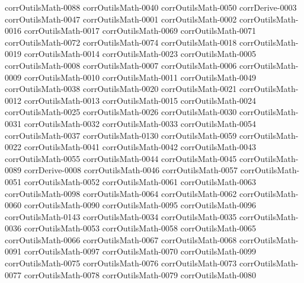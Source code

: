 {corrOutilsMath-0088}
{corrOutilsMath-0040}
{corrOutilsMath-0050}
{corrDerive-0003}
{corrOutilsMath-0047}
{corrOutilsMath-0001}
{corrOutilsMath-0002}
{corrOutilsMath-0016}
{corrOutilsMath-0017}
{corrOutilsMath-0069}
{corrOutilsMath-0071}
{corrOutilsMath-0072}
{corrOutilsMath-0074}
{corrOutilsMath-0018}
{corrOutilsMath-0019}
{corrOutilsMath-0014}
{corrOutilsMath-0023}
{corrOutilsMath-0005}
{corrOutilsMath-0008}
{corrOutilsMath-0007}
{corrOutilsMath-0006}
{corrOutilsMath-0009}
{corrOutilsMath-0010}
{corrOutilsMath-0011}
{corrOutilsMath-0049}
{corrOutilsMath-0038}
{corrOutilsMath-0020}
{corrOutilsMath-0021}
{corrOutilsMath-0012}
{corrOutilsMath-0013}
{corrOutilsMath-0015}
{corrOutilsMath-0024}
{corrOutilsMath-0025}
{corrOutilsMath-0026}
{corrOutilsMath-0030}
{corrOutilsMath-0031}
{corrOutilsMath-0032}
{corrOutilsMath-0033}
{corrOutilsMath-0054}
{corrOutilsMath-0037}
{corrOutilsMath-0130}
{corrOutilsMath-0059}
{corrOutilsMath-0022}
{corrOutilsMath-0041}
{corrOutilsMath-0042}
{corrOutilsMath-0043}
{corrOutilsMath-0055}
{corrOutilsMath-0044}
{corrOutilsMath-0045}
{corrOutilsMath-0089}
{corrDerive-0008}
{corrOutilsMath-0046}
{corrOutilsMath-0057}
{corrOutilsMath-0051}
{corrOutilsMath-0052}
{corrOutilsMath-0061}
{corrOutilsMath-0063}
{corrOutilsMath-0098}
{corrOutilsMath-0064}
{corrOutilsMath-0062}
{corrOutilsMath-0060}
{corrOutilsMath-0090}
{corrOutilsMath-0095}
{corrOutilsMath-0096}
{corrOutilsMath-0143}
{corrOutilsMath-0034}
{corrOutilsMath-0035}
{corrOutilsMath-0036}
{corrOutilsMath-0053}
{corrOutilsMath-0058}
{corrOutilsMath-0065}
{corrOutilsMath-0066}
{corrOutilsMath-0067}
{corrOutilsMath-0068}
{corrOutilsMath-0091}
{corrOutilsMath-0097}
{corrOutilsMath-0070}
{corrOutilsMath-0099}
{corrOutilsMath-0075}
{corrOutilsMath-0076}
{corrOutilsMath-0073}
{corrOutilsMath-0077}
{corrOutilsMath-0078}
{corrOutilsMath-0079}
{corrOutilsMath-0080}
